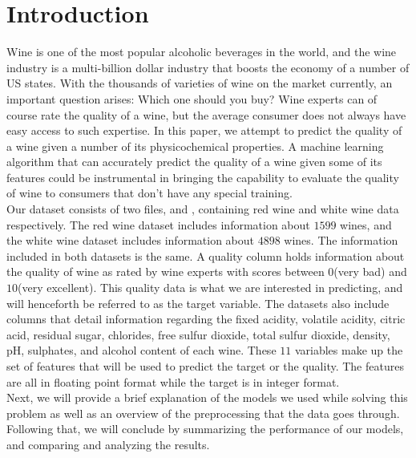 \section{Introduction}
\label{sec:intro}
Wine is one of the most popular alcoholic beverages in the world, and the wine industry is a multi-billion dollar industry that boosts the economy of a number of US states. With the thousands of varieties of wine on the market currently, an important question arises: Which one should you buy? Wine experts can of course rate the quality of a wine, but the average consumer does not always have easy access to such expertise. In this paper, we attempt to predict the quality of a wine given a number of its physicochemical properties. A machine learning algorithm that can accurately predict the quality of a wine given some of its features could be instrumental in bringing the capability to evaluate the quality of wine to consumers that don't have any special training.\\

Our dataset consists of two files,  and  \cite{dataset} , containing red wine and white wine data respectively. The red wine dataset includes information about $1599$ wines, and the white wine dataset includes information about $4898$ wines. The information included in both datasets is the same. A quality column holds information about the quality of wine as rated by wine experts with scores between $0$(very bad) and $10$(very excellent). This quality data is what we are interested in predicting, and will henceforth be referred to as the target variable. The datasets also include columns that detail information regarding the fixed acidity, volatile acidity, citric acid, residual sugar, chlorides, free sulfur dioxide, total sulfur dioxide, density, pH, sulphates, and alcohol content of each wine. These $11$ variables make up the set of features that will be used to predict the target or the quality. The features are all in floating point format while the target is in integer format.\\

Next, we will provide a brief explanation of the models we used while solving this problem as well as an overview of the preprocessing that the data goes through. Following that, we will conclude by summarizing the performance of our models, and comparing and analyzing the results.\\



